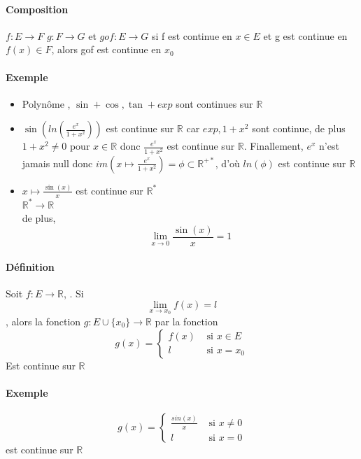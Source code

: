 \paragraph{Composition} $f:E \rightarrow F$ $g:F \rightarrow G$ et $gof : E \rightarrow G$
si f est continue en $x \in E$ et g est continue en $f(x) \in F$, alors gof est continue en $x_0$

\paragraph{Exemple} \begin{itemize}
	\item Polynôme , $\sin+\cos, \tan + exp$ sont continues sur $\mathbb{R}$
	\item $\sin(ln(\frac{e^x}{1+x^2}))$ est continue sur $\mathbb{R}$ car $exp, 1+x^2$ sont continue, de plus $1+x^2 \neq 0$ pour $x \in \mathbb{R}$ donc $\frac{e^x}{1+x^2}$ est continue sur $\mathbb{R}$.
	Finallement, $e^x$ n'est jamais null donc $im(x\mapsto \frac{e^x}{1+x^2}) = \phi \subset \mathbb{R}^{+*}$, d'où $ln(\phi)$ est continue sur $\mathbb{R}$
\item $x\mapsto \frac{\sin(x)}{x}$ est continue sur $\mathbb{R}^*$~\\
	$\mathbb{R^*} \rightarrow \mathbb{R}$
	~\\
	de plus, \[\lim_{x \to 0} \frac{\sin(x)}{x} = 1\] 
\end{itemize}

\paragraph{Définition} Soit $f:E \rightarrow \mathbb{R}$, .
Si \[\lim_{x\to x_0} f(x) = l\], alors la fonction $g:E\cup \{x_0\} \rightarrow \mathbb{R}$ par la fonction ~\\
	\[g(x) = \left\{
			\begin{array}{rl}
				f(x)& \text{ si } x \in  E \\
				l&\text{ si } x = x_0
			\end{array}
			\right.
		\]
		Est continue sur $\mathbb{R}$

\paragraph{Exemple} 

\[g(x) =
	\left\{
			\begin{array}{rl}
				\frac{sin(x)}{x} & \text{ si } x \neq 0 \\
				l&\text{ si } x = 0
			\end{array}
			\right.
		\]
		 est continue sur $\mathbb{R}$

